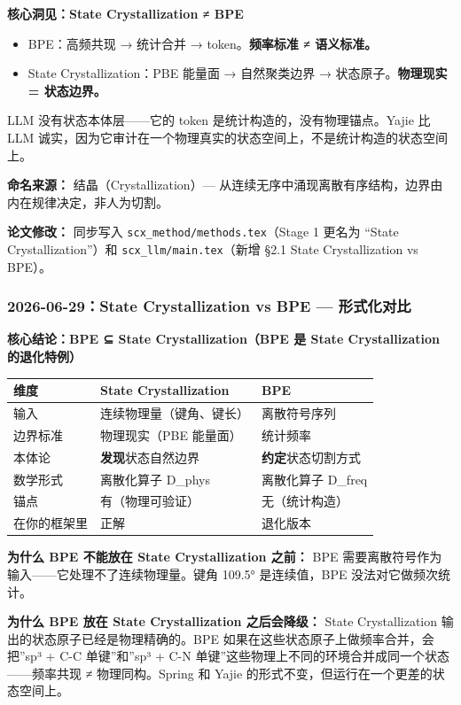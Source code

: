 \documentclass[
  12pt,
]{ctexart}
\providecommand{\tightlist}{%
  \setlength{\itemsep}{0pt}\setlength{\parskip}{0pt}}
\begin{document}
\textbf{核心洞见：State Crystallization ≠ BPE}

\begin{itemize}
\tightlist
\item
  BPE：高频共现 → 统计合并 → token。\textbf{频率标准 ≠ 语义标准。}
\item
  State Crystallization：PBE 能量面 → 自然聚类边界 →
  状态原子。\textbf{物理现实 = 状态边界。}
\end{itemize}

LLM 没有状态本体层------它的 token 是统计构造的，没有物理锚点。Yajie 比
LLM
诚实，因为它审计在一个物理真实的状态空间上，不是统计构造的状态空间上。

\textbf{命名来源：} 结晶（Crystallization）---
从连续无序中涌现离散有序结构，边界由内在规律决定，非人为切割。

\textbf{论文修改：} 同步写入 \texttt{scx\_method/methods.tex}（Stage 1
更名为 ``State Crystallization''）和 \texttt{scx\_llm/main.tex}（新增
§2.1 State Crystallization vs BPE）。

\subsubsection{2026-06-29：State Crystallization vs BPE ---
形式化对比}\label{state-crystallization-vs-bpe-ux5f62ux5f0fux5316ux5bf9ux6bd4}

\textbf{核心结论：BPE ⊆ State Crystallization（BPE 是 State
Crystallization 的退化特例）}

\begin{longtable}[]{@{}lll@{}}
\toprule\noalign{}
维度 & State Crystallization & BPE \\
\midrule\noalign{}
\endhead
\bottomrule\noalign{}
\endlastfoot
输入 & 连续物理量（键角、键长） & 离散符号序列 \\
边界标准 & 物理现实（PBE 能量面） & 统计频率 \\
本体论 & \textbf{发现}状态自然边界 & \textbf{约定}状态切割方式 \\
数学形式 & 离散化算子 D\_phys & 离散化算子 D\_freq \\
锚点 & 有（物理可验证） & 无（统计构造） \\
在你的框架里 & 正解 & 退化版本 \\
\end{longtable}

\textbf{为什么 BPE 不能放在 State Crystallization 之前：} BPE
需要离散符号作为输入------它处理不了连续物理量。键角 109.5°
是连续值，BPE 没法对它做频次统计。

\textbf{为什么 BPE 放在 State Crystallization 之后会降级：} State
Crystallization 输出的状态原子已经是物理精确的。BPE
如果在这些状态原子上做频率合并，会把''sp³ + C-C 单键''和''sp³ + C-N
单键''这些物理上不同的环境合并成同一个状态------频率共现 ≠
物理同构。Spring 和 Yajie 的形式不变，但运行在一个更差的状态空间上。
\end{document}
